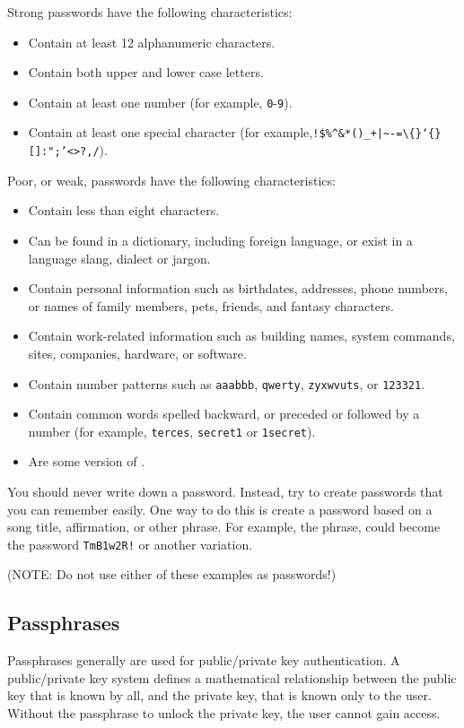 Strong passwords have the following characteristics:
\begin{itemize}
\item
Contain at least 12 alphanumeric characters.
\item
Contain both upper and lower case letters. 
\item
Contain at least one number (for example, \texttt{0}-\texttt{9}).
\item
Contain at least one special character (for example,\texttt{!\$\%\^{}\&*()\_+|\~{}-=\textbackslash\{\}`\{\}[]:";'<>?,/}).%
\end{itemize}
Poor, or weak, passwords have the following characteristics: 
\begin{itemize}
\item
Contain less than eight characters.
\item
Can be found in a dictionary, including foreign language, or exist in a language slang, dialect\oxford{} or jargon.
\item
Contain personal information such as birthdates, addresses, phone numbers, or names of family members, pets, friends, and fantasy characters.
\item
Contain work-related information such as building names, system commands, sites, companies, hardware, or software.
\item
Contain number patterns such as \texttt{aaabbb}, \texttt{qwerty}, \texttt{zyxwvuts}, or \texttt{123321}.
\item
Contain common words spelled backward, or preceded or followed by a number (for example, \texttt{terces}, \texttt{secret1} or \texttt{1secret}).
\item
Are some version of \oldnew{}{,}  .
\end{itemize}
You should never write down a password.  
Instead, try to create passwords that you can remember easily.  
One way to do this is create a password based on a song title, affirmation, or other phrase.  
For example, the phrase,  could become the password \texttt{TmB1w2R!} or another variation.

(NOTE: Do not use either of these examples as passwords!)

\subsection{Passphrases}
Passphrases generally are used for public/private key authentication.  
A public/private key system defines a mathematical relationship between the public key that is known by all, and the private key, that is known only to the user.  
Without the passphrase to unlock the private key, the user cannot gain access.

